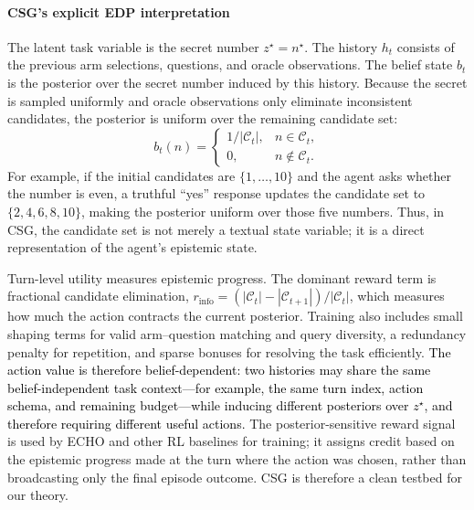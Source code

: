 \documentclass[11pt]{article}
\newcommand{\an}[1]{\textcolor{black}{#1}}
\theoremstyle{plain}
\theoremstyle{definition}
\theoremstyle{remark}
\begin{document}
\vspace*{-3mm}
\paragraph{CSG's explicit EDP interpretation} The latent task variable is the secret number \(z^\star=n^\star\). The history \(h_t\) consists of the previous arm selections, questions, and oracle observations. The belief state \(b_t\) is the posterior over the secret number induced by this history. Because the secret is sampled uniformly and oracle observations only eliminate inconsistent candidates, the posterior is uniform over the remaining candidate set:
\[
    b_t(n)=
    \begin{cases}
    1/|\mathcal{C}_t|, & n\in\mathcal{C}_t,\\
    0, & n\notin\mathcal{C}_t.
    \end{cases}
\]
For example, if the initial candidates are \(\{1,\ldots,10\}\) and the agent asks whether the number is even, a truthful ``yes'' response updates the candidate set to \(\{2,4,6,8,10\}\), making the posterior uniform over those five numbers. Thus, in CSG, the candidate set is not merely a textual state variable; it is a direct representation of the agent's epistemic state.

Turn-level utility measures epistemic progress. The dominant reward term is fractional candidate elimination, \(r_{\mathrm{info}}=(|\mathcal{C}_t|-|\mathcal{C}_{t+1}|)/|\mathcal{C}_t|\), which measures how much the action contracts the current posterior. Training also includes small shaping terms for valid arm--question matching and query diversity, a redundancy penalty for repetition, and sparse bonuses for resolving the task efficiently. \an{The action value is therefore belief-dependent: two histories may share the same belief-independent task context---for example, the same turn index, action schema, and remaining budget---while inducing different posteriors over \(z^\star\), and therefore requiring different useful actions. }
The posterior-sensitive reward signal is used by \textsc{ECHO} and other RL baselines for training; it assigns credit based on the epistemic progress made at the turn where the action was chosen, rather than broadcasting only the final episode outcome. CSG is therefore a clean testbed for our theory. 
\end{document}
